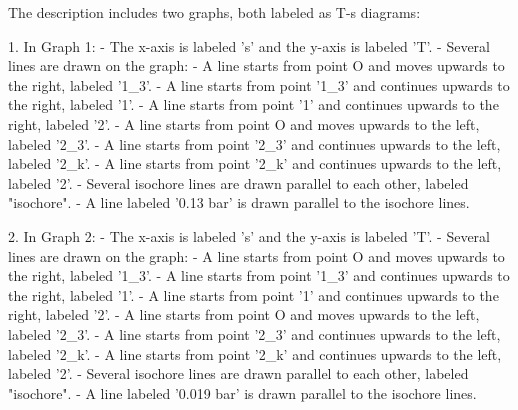 The description includes two graphs, both labeled as T-s diagrams:

1. In Graph 1:
   - The x-axis is labeled 's' and the y-axis is labeled 'T'.
   - Several lines are drawn on the graph:
     - A line starts from point O and moves upwards to the right, labeled '1_3'.
     - A line starts from point '1_3' and continues upwards to the right, labeled '1'.
     - A line starts from point '1' and continues upwards to the right, labeled '2'.
     - A line starts from point O and moves upwards to the left, labeled '2_3'.
     - A line starts from point '2_3' and continues upwards to the left, labeled '2_k'.
     - A line starts from point '2_k' and continues upwards to the left, labeled '2'.
     - Several isochore lines are drawn parallel to each other, labeled "isochore".
     - A line labeled '0.13 bar' is drawn parallel to the isochore lines.

2. In Graph 2:
   - The x-axis is labeled 's' and the y-axis is labeled 'T'.
   - Several lines are drawn on the graph:
     - A line starts from point O and moves upwards to the right, labeled '1_3'.
     - A line starts from point '1_3' and continues upwards to the right, labeled '1'.
     - A line starts from point '1' and continues upwards to the right, labeled '2'.
     - A line starts from point O and moves upwards to the left, labeled '2_3'.
     - A line starts from point '2_3' and continues upwards to the left, labeled '2_k'.
     - A line starts from point '2_k' and continues upwards to the left, labeled '2'.
     - Several isochore lines are drawn parallel to each other, labeled "isochore".
     - A line labeled '0.019 bar' is drawn parallel to the isochore lines.